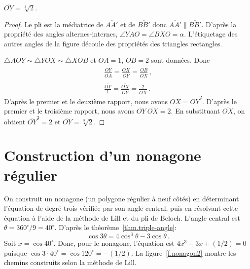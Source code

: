 \begin{theorem}
$\overline{OY}=\sqrt[3]{2}$.
\end{theorem}
\begin{proof}
Le pli est la médiatrice de $\overline{AA'}$ et de $\overline{BB'}$ donc $\overline{AA'}\parallel\overline{BB'}$. D'après la propriété des angles alternes-internes, $\angle YAO =\angle BXO=\alpha$. L'étiquetage des autres angles de la figure découle des propriétés des triangles rectangles.



$\triangle AOY\sim \triangle YOX \sim \triangle XOB$ et $\overline{OA}=1$, $\overline{OB}=2$ sont données. Donc
\[
\begin{array}{l}
\displaystyle\frac{\overline{OY}}{\overline{OA}}=\displaystyle\frac{\overline{OX}}{\overline{OY}}=\displaystyle\frac{\overline{OB}}{\overline{OX}}\,,\\
\\
\displaystyle\frac{\overline{OY}}{1}=\displaystyle\frac{\overline{OX}}{\overline{OY}}=\displaystyle\frac{2}{\overline{OX}}\,.
\end{array}
\]
D'après le premier et le deuxième rapport, nous avons $\overline{OX}=\overline{OY}^2$. D'après le premier et le troisième rapport, nous avons $\overline{OY}\:\overline{OX}=2$.
En substituant $\overline{OX}$, on obtient $\overline{OY}^3=2$ et 
$\overline{OY}=\sqrt[3]{2}$.
\end{proof}



\section{Construction d'un nonagone régulier}\label{s.nonagon}



On construit un nonagone (un polygone régulier à neuf côtés) en déterminant l'équation de degré trois vérifiée par son angle central, puis en résolvant cette équation à l'aide de la méthode de Lill et du pli de Beloch. L'angle central est 
 $\theta=360^\circ/9=40^\circ$. D'après le théorème~\ref{thm.triple-angle}:
\[
\cos 3\theta=4\cos^3 \theta -3\cos\theta\,.
\]
Soit $x=\cos 40^{\circ}$. Donc, pour le nonagone, l'équation est $4x^3-3x+(1/2)=0$ puisque $\cos 3\cdot 40^\circ=\cos 120^\circ=-(1/2)$. La figure~\ref{f.nonagon2} montre les chemins construits  selon la méthode de Lill.

